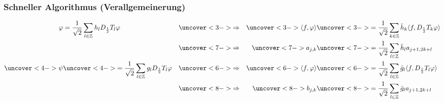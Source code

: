 %
%
\begin{frame}
\frametitle{Schneller Algorithmus (Verallgemeinerung)}
\begin{align*}
\varphi
&=
\frac1{\sqrt{2}}
\sum_{l\in\mathbb Z} h_l D_{\frac12}T_l\varphi
&&\uncover<3->{\Rightarrow}&
\uncover<3->{\langle f,\varphi\rangle}
&\uncover<3->{=
\frac{1}{\sqrt{2}} \sum_{k\in\mathbb Z} \bar{h}_k\langle f,D_{\frac12}T_k\varphi\rangle}
\\
&&&\uncover<7->{\Rightarrow}&
\uncover<7->{a_{j,k}}
&\uncover<7->{=
\frac{1}{\sqrt{2}} \sum_{l\in\mathbb Z}\bar{h}_l a_{j+1,2k+l}}
\\
\uncover<4->{\psi}
&\uncover<4->{=
\frac1{\sqrt{2}}
\sum_{l\in\mathbb Z} g_l D_{\frac12}T_l\varphi}
&&\uncover<6->{\Rightarrow}&
\uncover<6->{\langle f,\varphi\rangle}
&\uncover<6->{=
\frac{1}{\sqrt{2}} \sum_{l\in\mathbb Z} \bar{g}_l\langle f,D_{\frac12}T_l\varphi\rangle}
\\
&&&\uncover<8->{\Rightarrow}&
\uncover<8->{b_{j,k}}
&\uncover<8->{=
\frac{1}{\sqrt{2}} 
\sum_{l\in\mathbb Z} \bar{g}_l a_{j+1,2k+l}}
\end{align*}

\end{frame}
